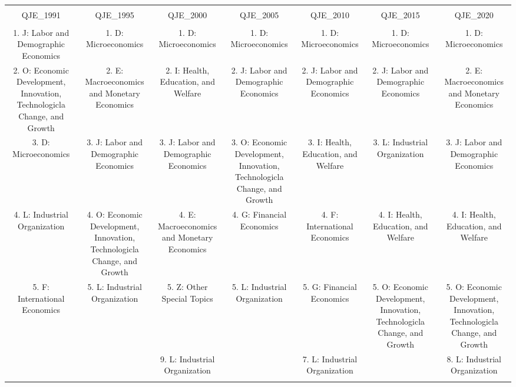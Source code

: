 
\begin{table}[!htbp] \centering 
  \caption{} 
  \label{} 
\begin{tabular}{@{\extracolsep{5pt}} ccccccc} 
\\[-1.8ex]\hline 
\hline \\[-1.8ex] 
QJE\_1991 & QJE\_1995 & QJE\_2000 & QJE\_2005 & QJE\_2010 & QJE\_2015 & QJE\_2020 \\ 
\hline \\[-1.8ex] 
1. J: Labor and Demographic Economics & 1. D: Microeconomics & 1. D: Microeconomics & 1. D: Microeconomics & 1. D: Microeconomics & 1. D: Microeconomics & 1. D: Microeconomics \\ 
2. O: Economic Development, Innovation, Technologicla Change, and Growth & 2. E: Macroeconomics and Monetary Economics & 2. I: Health, Education, and Welfare & 2. J: Labor and Demographic Economics & 2. J: Labor and Demographic Economics & 2. J: Labor and Demographic Economics & 2. E: Macroeconomics and Monetary Economics \\ 
3. D: Microeconomics & 3. J: Labor and Demographic Economics & 3. J: Labor and Demographic Economics & 3. O: Economic Development, Innovation, Technologicla Change, and Growth & 3. I: Health, Education, and Welfare & 3. L: Industrial Organization & 3. J: Labor and Demographic Economics \\ 
4. L: Industrial Organization & 4. O: Economic Development, Innovation, Technologicla Change, and Growth & 4. E: Macroeconomics and Monetary Economics & 4. G: Financial Economics & 4. F: International Economics & 4. I: Health, Education, and Welfare & 4. I: Health, Education, and Welfare \\ 
5. F: International Economics & 5. L: Industrial Organization & 5. Z: Other Special Topics & 5. L: Industrial Organization & 5. G: Financial Economics & 5. O: Economic Development, Innovation, Technologicla Change, and Growth & 5. O: Economic Development, Innovation, Technologicla Change, and Growth \\ 
 &  & 9. L: Industrial Organization &  & 7. L: Industrial Organization &  & 8. L: Industrial Organization \\ 
\hline \\[-1.8ex] 
\end{tabular} 
\end{table} 
